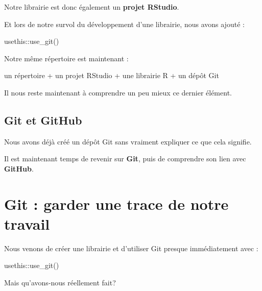 \documentclass[
  letterpaper,
  DIV=11,
  numbers=noendperiod]{scrreprt}
\newenvironment{Shaded}{\begin{snugshade}}{\end{snugshade}}
\newcommand{\FunctionTok}[1]{\textcolor[rgb]{0.28,0.35,0.67}{#1}}
\newcommand{\NormalTok}[1]{\textcolor[rgb]{0.00,0.23,0.31}{#1}}
\newcommand{\SpecialCharTok}[1]{\textcolor[rgb]{0.37,0.37,0.37}{#1}}
\begin{document}
Notre librairie est donc également un \textbf{projet RStudio}.

Et lors de notre survol du développement d'une librairie, nous avons
ajouté :

\begin{Shaded}
\begin{Highlighting}[]
\NormalTok{usethis}\SpecialCharTok{::}\FunctionTok{use\_git}\NormalTok{()}
\end{Highlighting}
\end{Shaded}

Notre même répertoire est maintenant :

\begin{Shaded}
\begin{Highlighting}[]
\NormalTok{un répertoire}
\NormalTok{      +}
\NormalTok{un projet RStudio}
\NormalTok{      +}
\NormalTok{une librairie R}
\NormalTok{      +}
\NormalTok{un dépôt Git}
\end{Highlighting}
\end{Shaded}

Il nous reste maintenant à comprendre un peu mieux ce dernier élément.

\section{Git et GitHub}\label{git-et-github}

Nous avons déjà créé un dépôt Git sans vraiment expliquer ce que cela
signifie.

Il est maintenant temps de revenir sur \textbf{Git}, puis de comprendre
son lien avec \textbf{GitHub}.


\chapter{Git : garder une trace de notre
travail}\label{git-garder-une-trace-de-notre-travail}

Nous venons de créer une librairie et d'utiliser Git presque
immédiatement avec :

\begin{Shaded}
\begin{Highlighting}[]
\NormalTok{usethis}\SpecialCharTok{::}\FunctionTok{use\_git}\NormalTok{()}
\end{Highlighting}
\end{Shaded}

Mais qu'avons-nous réellement fait?
\end{document}
